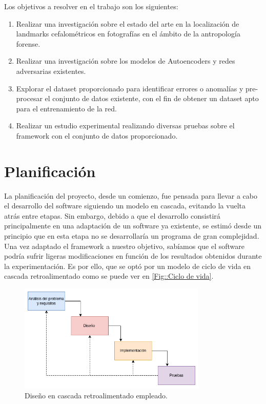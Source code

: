 \noindent Los objetivos a resolver en el trabajo son los siguientes: 

\begin{enumerate}
    \item Realizar una investigación sobre el estado del arte en la localización de landmarks cefalométricos en fotografías en el ámbito de la antropología forense.
    \item Realizar una investigación sobre los modelos de Autoencoders y redes adversarias existentes.
    \item Explorar el dataset proporcionado para identificar errores o anomalías y pre-procesar el conjunto de datos existente, con el fin de obtener un dataset apto para el entrenamiento de la red.
    \item Realizar un estudio experimental realizando diversas pruebas sobre el framework con el conjunto de datos proporcionado.
\end{enumerate}

\section{Planificación}
    \noindent La planificación del proyecto, desde un comienzo, fue pensada para llevar a cabo el desarrollo del software siguiendo un modelo en cascada, evitando la vuelta atrás entre etapas. Sin embargo, debido a que el desarrollo consistirá principalmente en una adaptación de un software ya existente, se estimó desde un principio que en esta etapa no se desarrollaría un programa de gran complejidad. Una vez adaptado el framework a nuestro objetivo, sabíamos que el software podría sufrir ligeras modificaciones en función de los resultados obtenidos durante la experimentación. Es por ello, que se optó por un modelo de ciclo de vida en cascada retroalimentado como se puede ver en \autoref{Fig::Ciclo de vida}.


    \begin{figure}[!h]
        \centering
        \includegraphics[width=0.8\textwidth]{img/disenio_cascada.png}
        \caption{Diseño en cascada retroalimentado empleado.}
        \label{Fig::Ciclo de vida}
    \end{figure}

